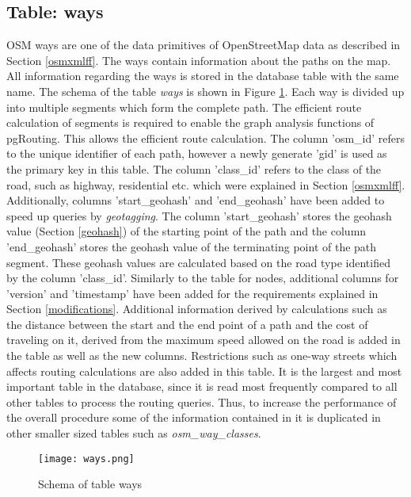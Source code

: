 \subsection{Table: ways}
OSM ways are one of the data primitives of OpenStreetMap data as described in Section \ref{osmxmlff}. The ways contain information about the paths on the map. All information regarding the ways is stored in the database table with the same name. The schema of the table \textit{ways} is shown in Figure \ref{fg:ways}. Each way is divided up into multiple segments which form the complete path. The efficient route calculation of segments is required to enable the graph analysis functions of pgRouting. This allows the efficient route calculation. The column 'osm{\_}id' refers to the unique identifier of each path, however a newly generate 'gid' is used as the primary key in this table. The column 'class{\_}id' refers to the class of the road, such as highway, residential etc. which were explained in Section \ref{osmxmlff}. Additionally, columns 'start{\_}geohash' and 'end{\_}geohash' have been added to speed up queries by \textit{geotagging}. The column 'start{\_}geohash' stores the geohash value (Section \ref{geohash}) of the starting point of the path and the column 'end{\_}geohash' stores the geohash value of the terminating point of the path segment. These geohash values are calculated based on the road type identified by the column 'class{\_}id'. Similarly to the table for nodes, additional columns for 'version' and 'timestamp' have been added for the requirements explained in Section \ref{modifications}. Additional information derived by calculations such as the distance between the start and the end point of a path and the cost of traveling on it, derived from the maximum speed allowed on the road is added in the table as well as the new columns. Restrictions such as one-way streets which affects routing calculations are also added in this table. It is the largest and most important table in the database, since it is read most frequently compared to all other tables to process the routing queries. Thus, to increase the performance of the overall procedure some of the information contained in it is duplicated in other smaller sized tables such as \textit{osm{\_}way{\_}classes}.   
\begin{figure}
\texttt{[image: ways.png]}
\caption{Schema of table ways}
\label{fg:ways}
\end{figure}

